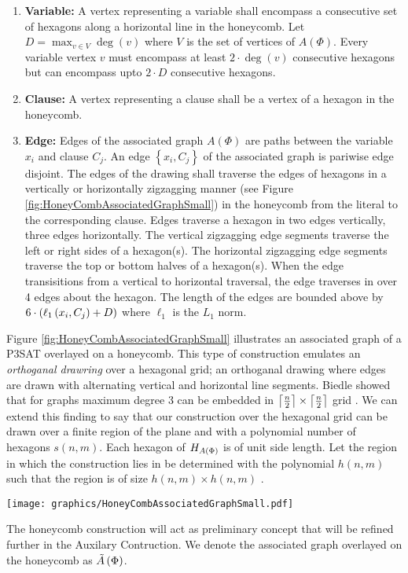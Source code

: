 \begin{enumerate}
\item \textbf{Variable:} A vertex representing a variable shall encompass a consecutive set of hexagons along a horizontal line in the honeycomb. 
Let $D = \max_{v \in V} \deg(v)$ where $V$ is the set of vertices of $A(\Phi)$.
Every variable vertex $v$  must encompass at least $2 \cdot \deg(v)$ consecutive hexagons but can encompass upto $2 \cdot D$ consecutive hexagons.
\item \textbf{Clause:} A vertex representing a clause shall be a vertex of a hexagon in the honeycomb.
\item \textbf{Edge:} Edges of the associated graph $A(\Phi)$ are paths between the variable $x_i$ and clause $C_j$.  An edge $\left\lbrace x_i, C_j \right\rbrace$ of the associated graph is pariwise edge disjoint. 
The edges of the drawing shall traverse the edges of hexagons in a vertically or horizontally zigzagging manner (see Figure \ref{fig:HoneyCombAssociatedGraphSmall}) in the honeycomb from the literal to the corresponding clause. 
Edges traverse a hexagon in two edges vertically, three edges horizontally.  
The vertical zigzagging edge segments traverse the left or right sides of a hexagon(s).
The horizontal zigzagging edge segments traverse the top or bottom halves of a hexagon(s).
When the edge transisitions from a vertical to horizontal traversal, the edge traverses in over 4 edges about the hexagon.
The length of the edges are bounded above by $6 \cdot \left( \ell_1 \left( x_i,C_j \right) + D \right)$ where $\ell_1$ is the $L_1$ norm. 
\end{enumerate}
Figure \ref{fig:HoneyCombAssociatedGraphSmall} illustrates an associated graph of a P3SAT overlayed on a honeycomb.
This type of construction emulates an \textit{orthoganal drawring} over a hexagonal grid; an orthoganal drawing where edges are drawn with alternating vertical and horizontal line segments.
Biedle showed that for graphs maximum degree 3 can be embedded in $\left\lceil \frac{n}{2} \right\rceil\times \left\lceil \frac{n}{2} \right\rceil$ grid \cite{biedl}.
We can extend this finding to say that our construction over the hexagonal grid can be drawn over a finite region of the plane and with a polynomial number of hexagons $s(n,m)$.
Each hexagon of $H_{A \left( \Phi \right)}$ is of unit side length. 
Let the region in which the construction lies in be determined with the polynomial $h(n,m)$ such that the region is of size $h(n,m) \times h(n,m)$ \cite{BK+98}.

\begin{minipage}{\linewidth}
\begin{center}
\texttt{[image: graphics/HoneyCombAssociatedGraphSmall.pdf]}
\label{fig:HoneyCombAssociatedGraphSmall}
\end{center}
\end{minipage}

The honeycomb construction will act as preliminary concept that will be refined further in the Auxilary Contruction.
We denote the associated graph overlayed on the honeycomb as $\tilde{A}\left( \Phi \right)$.